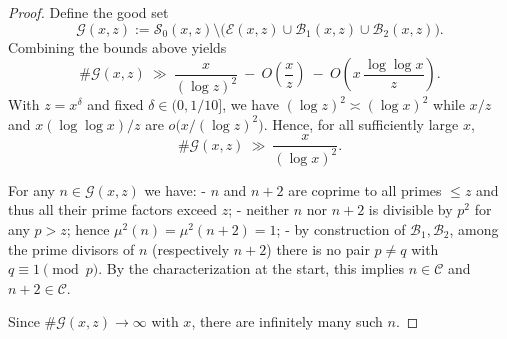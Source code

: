 \documentclass[12pt]{article}
\theoremstyle{remark}
\begin{document}
\begin{proof}
Define the good set
$$
\mathcal G(x,z):=\mathcal S_0(x,z)\setminus\bigl(\mathcal E(x,z)\cup\mathcal B_1(x,z)\cup\mathcal B_2(x,z)\bigr).
$$
Combining the bounds above yields
$$
\#\mathcal G(x,z)\ \gg\ \frac{x}{(\log z)^2}\ -\ O\!\left(\frac{x}{z}\right)\ -\ O\!\left(x\,\frac{\log\log x}{z}\right).
$$
With $z=x^{\delta}$ and fixed $\delta\in(0,1/10]$, we have $(\log z)^2\asymp(\log x)^2$ while $x/z$ and $x(\log\log x)/z$ are $o\bigl(x/(\log z)^2\bigr)$. Hence, for all sufficiently large $x$,
$$
\#\mathcal G(x,z)\ \gg\ \frac{x}{(\log x)^2}.
$$

For any $n\in\mathcal G(x,z)$ we have:
- $n$ and $n+2$ are coprime to all primes $\le z$ and thus all their prime factors exceed $z$;
- neither $n$ nor $n+2$ is divisible by $p^2$ for any $p>z$; hence $\mu^2(n)=\mu^2(n+2)=1$;
- by construction of $\mathcal B_1,\mathcal B_2$, among the prime divisors of $n$ (respectively $n+2$) there is no pair $p\ne q$ with $q\equiv1\pmod p$.
By the characterization at the start, this implies $n\in\mathcal C$ and $n+2\in\mathcal C$.

Since $\#\mathcal G(x,z)\to\infty$ with $x$, there are infinitely many such $n$. 
\end{proof}
\end{document}
